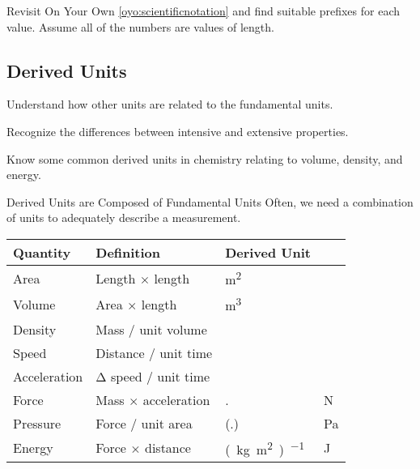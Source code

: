 \documentclass[notes=show]{beamer}
\begin{document}
\begin{onyourown}[10em]
	Revisit On Your Own \ref{oyo:scientificnotation} and find suitable
	prefixes for each value. Assume all of the numbers are values of length.
\end{onyourown}

\begin{frame}{}
	\section{Derived Units}
	\begin{learningobjectives}
		\item Understand how other units are related to the fundamental
			units.
		\item Recognize the differences between intensive and extensive
			properties.
		\item Know some common derived units in chemistry relating to
			volume, density, and energy.
	\end{learningobjectives}
\end{frame}

\begin{frame}{Derived Units are Composed of Fundamental Units}
	Often, we need a combination of units to adequately describe a
	measurement.

	\begin{center}
	\begin{tabular} {@{}*{3}{l}l}
		\toprule \bfseries
		Quantity     & \bfseries Definition                 &
		\multicolumn{2}{l}{\bfseries Derived Unit}                                                   \\
		\midrule
		Area         & Length $\times$ length     & \si{\meter\squared                                  }                              \\
		Volume       & Area $\times$ length       & \si{\meter\cubed                                    }                              \\
		Density      & Mass / unit volume         & \si{\kilo\gram\per{\meter\cubed}                    }                              \\
		Speed        & Distance / unit time       & \si{\meter\per{\second}                             }                              \\
		Acceleration & Δ speed / unit time        & \si{\meter\per{\second\squared}                     }                              \\
		Force        & Mass $\times$ acceleration &
		\si{\kilo\gram.\meter\per{\second\squared}          } & \textrightarrow\ \si{\newton} \\
		Pressure     & Force / unit area          &
		\si{\kilo\gram\per(\meter.\second\squared)          } & \textrightarrow\ \si{\pascal} \\
		Energy       & Force $\times$ distance    &
		\si{(\kilo\gram.\meter\squared)\per{\second\squared}} & \textrightarrow\ \si{\joule}  \\
		\bottomrule
	\end{tabular}
	\end{center}
\end{frame}
\end{document}
